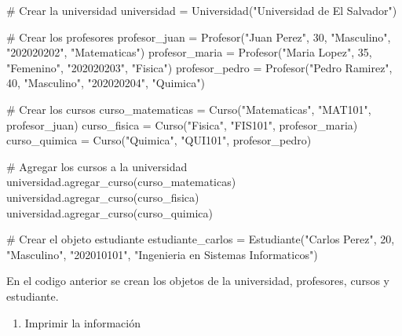 \documentclass[
  a4paper,
  DIV=11,
  numbers=noendperiod,
  onepage,
  openany]{scrreprt}
\newenvironment{Shaded}{\begin{snugshade}}{\end{snugshade}}
\newcommand{\CommentTok}[1]{\textcolor[rgb]{0.37,0.37,0.37}{#1}}
\newcommand{\DecValTok}[1]{\textcolor[rgb]{0.68,0.00,0.00}{#1}}
\newcommand{\NormalTok}[1]{\textcolor[rgb]{0.00,0.23,0.31}{#1}}
\newcommand{\OperatorTok}[1]{\textcolor[rgb]{0.37,0.37,0.37}{#1}}
\newcommand{\StringTok}[1]{\textcolor[rgb]{0.13,0.47,0.30}{#1}}
\providecommand{\tightlist}{%
  \setlength{\itemsep}{0pt}\setlength{\parskip}{0pt}}\usepackage{longtable,booktabs,array}
\begin{document}
\begin{Shaded}
\begin{Highlighting}[]
\CommentTok{\# Crear la universidad}
\NormalTok{universidad }\OperatorTok{=}\NormalTok{ Universidad(}\StringTok{"Universidad de El Salvador"}\NormalTok{)}

\CommentTok{\# Crear los profesores}
\NormalTok{profesor\_juan }\OperatorTok{=}\NormalTok{ Profesor(}\StringTok{"Juan Perez"}\NormalTok{, }\DecValTok{30}\NormalTok{, }\StringTok{"Masculino"}\NormalTok{, }\StringTok{"202020202"}\NormalTok{, }\StringTok{"Matematicas"}\NormalTok{)}
\NormalTok{profesor\_maria }\OperatorTok{=}\NormalTok{ Profesor(}\StringTok{"Maria Lopez"}\NormalTok{, }\DecValTok{35}\NormalTok{, }\StringTok{"Femenino"}\NormalTok{, }\StringTok{"202020203"}\NormalTok{, }\StringTok{"Fisica"}\NormalTok{)}
\NormalTok{profesor\_pedro }\OperatorTok{=}\NormalTok{ Profesor(}\StringTok{"Pedro Ramirez"}\NormalTok{, }\DecValTok{40}\NormalTok{, }\StringTok{"Masculino"}\NormalTok{, }\StringTok{"202020204"}\NormalTok{, }\StringTok{"Quimica"}\NormalTok{)}

\CommentTok{\# Crear los cursos}
\NormalTok{curso\_matematicas }\OperatorTok{=}\NormalTok{ Curso(}\StringTok{"Matematicas"}\NormalTok{, }\StringTok{"MAT101"}\NormalTok{, profesor\_juan)}
\NormalTok{curso\_fisica }\OperatorTok{=}\NormalTok{ Curso(}\StringTok{"Fisica"}\NormalTok{, }\StringTok{"FIS101"}\NormalTok{, profesor\_maria)}
\NormalTok{curso\_quimica }\OperatorTok{=}\NormalTok{ Curso(}\StringTok{"Quimica"}\NormalTok{, }\StringTok{"QUI101"}\NormalTok{, profesor\_pedro)}

\CommentTok{\# Agregar los cursos a la universidad}
\NormalTok{universidad.agregar\_curso(curso\_matematicas)}
\NormalTok{universidad.agregar\_curso(curso\_fisica)}
\NormalTok{universidad.agregar\_curso(curso\_quimica)}

\CommentTok{\# Crear el objeto estudiante}
\NormalTok{estudiante\_carlos }\OperatorTok{=}\NormalTok{ Estudiante(}\StringTok{"Carlos Perez"}\NormalTok{, }\DecValTok{20}\NormalTok{, }\StringTok{"Masculino"}\NormalTok{, }\StringTok{"202010101"}\NormalTok{, }\StringTok{"Ingenieria en Sistemas Informaticos"}\NormalTok{)}
\end{Highlighting}
\end{Shaded}

En el codigo anterior se crean los objetos de la universidad,
profesores, cursos y estudiante.

\begin{enumerate}
\def\labelenumi{\arabic{enumi}.}
\setcounter{enumi}{6}
\tightlist
\item
  Imprimir la información
\end{enumerate}
\end{document}
